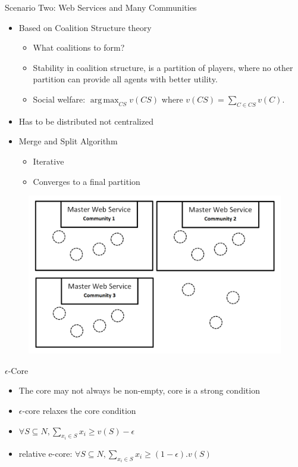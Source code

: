 \documentclass{beamer}
\begin{document}
\begin{frame}{Scenario Two: Web Services and Many Communities}
    \begin{itemize}
        \item Based on Coalition Structure theory
        \begin{itemize}
            \item What coalitions to form?
            \item Stability in coalition structure, is a partition of players, where no other partition can provide all agents with better utility.
            \item Social welfare: $\operatorname*{arg\,max}_{CS} v(CS)$ where $v(CS) = \sum_{C \in CS}v(C)$.
        \end{itemize}
        \item Has to be distributed not centralized
        \item Merge and Split Algorithm {\footnotesize{\color{blue}{(Krzysztof R. Apt and Andreas Witzel)}}}
        \begin{itemize}
            \item Iterative
            \item Converges to a final partition
        \end{itemize}
    \end{itemize}
    \begin{figure}[htbp]
        \centering
        \includegraphics[width=0.5 \columnwidth]{figures/scenario2.png}
    \end{figure}       	
\end{frame}

\begin{frame}{$\epsilon$-Core}
    \begin{itemize}
        \item The core may not always be non-empty, core is a strong condition
        \item $\epsilon$-core relaxes the core condition
        \item $\forall S \subseteq N, \sum_{x_i \in S} x_i \geq v(S) - \epsilon$
        \item relative e-core: $\forall S \subseteq N, \sum_{x_i \in S} x_i \geq (1-\epsilon).v(S)$
    \end{itemize}
\end{frame}
\end{document}
